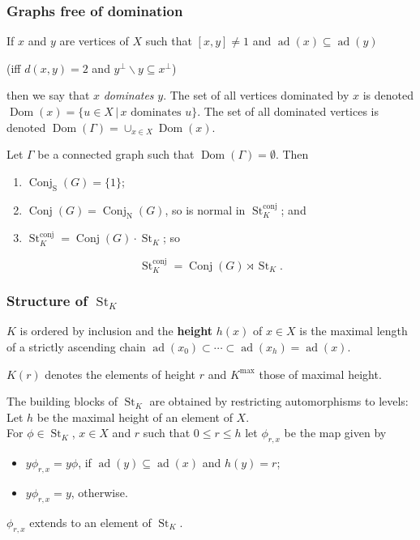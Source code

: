\documentclass{beamer}
\def\nul{\emptyset }
\def\G{\Gamma }
\newcommand{\ad}{{\operatorname{ad}}}
\newcommand{\bs}{\backslash}
\newcommand{\conj}{\operatorname{conj}}
\newcommand{\St}{\operatorname{St}}
\newcommand{\cSt}{\St^{\conj}}
\newcommand{\Conj}{\operatorname{Conj}}
\newcommand{\NConj}{\Conj_{\operatorname{N}}}
\newcommand{\sConj}{\Conj_{\operatorname{S}}}
\newcommand{\Isol}{\operatorname{Dom}}
\newcommand{\be}{\begin{enumerate}}
\newcommand{\ee}{\end{enumerate}}
\newcommand{\bei}{\begin{itemize}}
\newcommand{\eei}{\end{itemize}}
\begin{document}
\begin{frame}
\frametitle{Graphs free of domination}
If $x$ and $y$ are vertices of $X$ such that 
$[x,y]\neq 1$ and
$\ad(x)\subseteq \ad(y)$ \pause

(iff $d(x,y)=2$ and $y^\perp\bs y\subseteq x^\perp$)

\pause

then we say that 
$x$ {\em dominates} $y$. The set of all vertices dominated by $x$ is denoted 
$\Isol(x)=\{u\in X\,|\, x \textrm{ dominates } u\}$. The set of all dominated
vertices is denoted $\Isol(\G)=\cup_{x\in X}\Isol(x)$. \\[1em]

\pause

  \begin{theorem}\label{theorem:nolocisol} Let $\G$ be a connected graph 
such that $\Isol(\G)=\nul$. Then 
\be
\item 
$\sConj(G)=\{1\}$;
\item $\Conj(G)=\NConj(G)$, so is normal in $\cSt_K$; and  
\item $\cSt_K=\Conj(G)\cdot \St_K$; so
\ee
\[\cSt_K=\Conj(G)\rtimes \St_K.\]
\end{theorem}
\end{frame}
\begin{frame}
\frametitle{Structure of $\St_K$}
$K$ is ordered by inclusion and the {\bf height} $h(x)$ of  $x\in X$ is the
maximal length of a strictly ascending  chain $\ad(x_0)\subset\cdots \subset \ad(x_h)=\ad(x)$.\\[1em]
\pause

$K(r)$ denotes the elements of height $r$ and $K^{\max}$ those of maximal height. 
\pause

The building blocks of $\St_K$ are obtained by restricting automorphisms to levels:\\[1em]
Let $h$ be the maximal height of an element of $X$.\\[1em] 
For $\phi\in \St_K$, $x\in X$ and $r$ such that $0\le r\le h$ let $\phi_{r,x}$ be the 
map given by
\bei
\item $y\phi_{r,x}=y\phi$, if $\ad(y)\subseteq \ad(x)$ and $h(y)=r$;
\item $y\phi_{r,x}=y$, otherwise.
\eei
  
\pause
$\phi_{r,x}$ extends to an element of $\St_K$. 
\end{frame}
\end{document}
